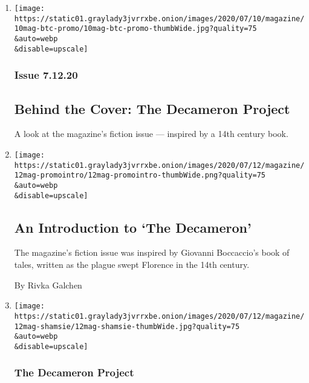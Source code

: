 \begin{enumerate}
\def\labelenumi{\arabic{enumi}.}
\item
  \href{/2020/07/10/magazine/behind-the-cover-the-decameron-project.html}{}

  \texttt{[image: https://static01.graylady3jvrrxbe.onion/images/2020/07/10/magazine/10mag-btc-promo/10mag-btc-promo-thumbWide.jpg?quality=75\\\&auto=webp\\\&disable=upscale]}

  \hypertarget{issue-71220}{%
  \subsubsection{Issue 7.12.20}\label{issue-71220}}

  \hypertarget{behind-the-cover-the-decameron-project}{%
  \subsection{Behind the Cover: The Decameron
  Project}\label{behind-the-cover-the-decameron-project}}

  A look at the magazine's fiction issue --- inspired by a 14th century
  book.
\item
  \href{/interactive/2020/07/07/magazine/what-is-the-decameron.html}{}

  \texttt{[image: https://static01.graylady3jvrrxbe.onion/images/2020/07/12/magazine/12mag-promointro/12mag-promointro-thumbWide.png?quality=75\\\&auto=webp\\\&disable=upscale]}

  \hypertarget{an-introduction-to-the-decameron}{%
  \subsection{An Introduction to `The
  Decameron'}\label{an-introduction-to-the-decameron}}

  The magazine's fiction issue was inspired by Giovanni Boccaccio's book
  of tales, written as the plague swept Florence in the 14th century.

  By Rivka Galchen
\item
  \href{/interactive/2020/07/07/magazine/kamila-shamsie-short-story.html}{}

  \texttt{[image: https://static01.graylady3jvrrxbe.onion/images/2020/07/12/magazine/12mag-shamsie/12mag-shamsie-thumbWide.jpg?quality=75\\\&auto=webp\\\&disable=upscale]}

  \hypertarget{the-decameron-project-8}{%
  \subsubsection{The Decameron Project}\label{the-decameron-project-8}}


\end{enumerate}
